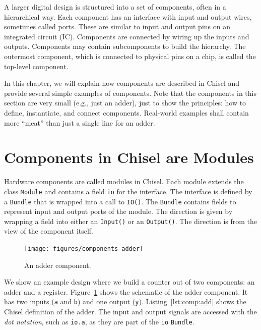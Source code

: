 \documentclass[%
    10pt,
    headinclude, footexclude,
    openright, %
    notitlepage,
    cleardoubleempty,
    headsepline,
    pointlessnumbers,
    bibtotoc, idxtotoc,
    ]{scrbook}
\newcommand{\code}[1]{{\small{\texttt{#1}}}}
\begin{document}
A larger digital design is structured into a set of components, often in
a hierarchical way. Each component has an interface with input and output
wires, sometimes called ports. These are similar to input and output pins on an integrated circuit (IC).
Components are connected by wiring up the inputs and outputs.
Components may contain subcomponents to build the hierarchy.
The outermost component, which is connected to physical pins
on a chip, is called the top-level component.

In this chapter, we will explain how components are described in Chisel and
provide several simple examples of components.
Note that the components in this section are very small (e.g., just an adder),
just to show the principles: how to define, instantiate, and connect components.
Real-world examples shall contain more ``meat'' than just a single line for
an adder.

\section{Components in Chisel are Modules}


Hardware components are called modules in Chisel. Each module extends
the class \code{Module} and contains a field \code{io} for the interface.
The interface is defined by a \code{Bundle} that is wrapped into a call to \code{IO()}.
The \code{Bundle} contains fields to represent input and output ports of
the module. The direction is given by wrapping a field into either an \code{Input()}
or an \code{Output()}. The direction is from the view of the component itself.


\begin{figure}
  \centering
  \texttt{[image: figures/components-adder]}
  \caption{An adder component.}
  \label{fig:components-adder}
\end{figure}


We show an example design where we build a counter out of two components:
an adder and a register.
Figure~\ref{fig:components-adder} shows the schematic of the adder component.
It has two inputs (\code{a} and \code{b}) and one output (\code{y}).
Listing~\ref{lst:comp:add} shows the Chisel definition of the adder.
The input and output signals are accessed with
the \emph{dot notation}, such as \code{io.a}, as they are part of the \code{io}
\code{Bundle}.
\end{document}
